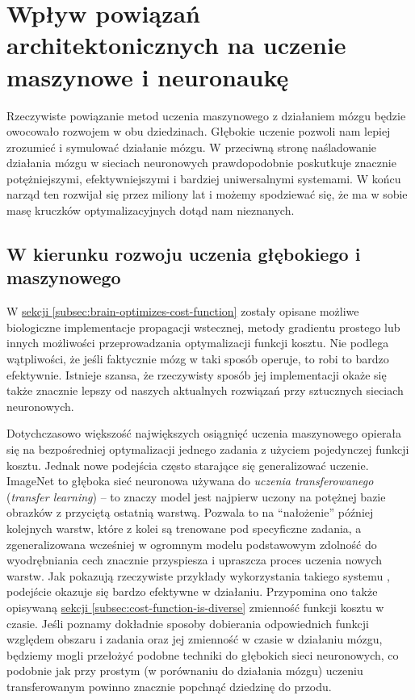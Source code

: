 \section{Wpływ powiązań architektonicznych na uczenie maszynowe i neuronaukę}

Rzeczywiste powiązanie metod uczenia maszynowego z działaniem mózgu będzie owocowało rozwojem w obu dziedzinach.
Głębokie uczenie pozwoli nam lepiej zrozumieć i symulować działanie mózgu.
W przeciwną stronę naśladowanie działania mózgu w sieciach neuronowych prawdopodobnie poskutkuje znacznie potężniejszymi, efektywniejszymi i bardziej uniwersalnymi systemami.
W końcu narząd ten rozwijał się przez miliony lat i możemy spodziewać się, że ma w sobie masę kruczków optymalizacyjnych dotąd nam nieznanych.

\subsection{W kierunku rozwoju uczenia głębokiego i maszynowego}

W \hyperref[subsec:brain-optimizes-cost-function]{sekcji \ref*{subsec:brain-optimizes-cost-function}} zostały opisane możliwe biologiczne implementacje propagacji wstecznej, metody gradientu prostego lub innych możliwości przeprowadzania optymalizacji funkcji kosztu.
Nie podlega wątpliwości, że jeśli faktycznie mózg w taki sposób operuje, to robi to bardzo efektywnie.
Istnieje szansa, że rzeczywisty sposób jej implementacji okaże się także znacznie lepszy od naszych aktualnych rozwiązań przy sztucznych sieciach neuronowych.

Dotychczasowo większość największych osiągnięć uczenia maszynowego opierała się na bezpośredniej optymalizacji jednego zadania z użyciem pojedynczej funkcji kosztu.
Jednak nowe podejścia często starające się generalizować uczenie.
ImageNet to głęboka sieć neuronowa używana do \emph{uczenia transferowanego} (\emph{transfer learning}) -- to znaczy model jest najpierw uczony na potężnej bazie obrazków z przyciętą ostatnią warstwą.
Pozwala to na ``nałożenie'' później kolejnych warstw, które z kolei są trenowane pod specyficzne zadania, a zgeneralizowana wcześniej w ogromnym modelu podstawowym zdolność do wyodrębniania cech znacznie przyspiesza i upraszcza proces uczenia nowych warstw.
Jak pokazują rzeczywiste przykłady wykorzystania takiego systemu \cite{marmanis2015deep}, podejście okazuje się bardzo efektywne w działaniu.
Przypomina ono także opisywaną \hyperref[subsec:cost-function-is-diverse]{sekcji \ref*{subsec:cost-function-is-diverse}} zmienność funkcji kosztu w czasie.
Jeśli poznamy dokładnie sposoby dobierania odpowiednich funkcji względem obszaru i zadania oraz jej zmienność w czasie w działaniu mózgu, będziemy mogli przełożyć podobne techniki do głębokich sieci neuronowych, co podobnie jak przy prostym (w porównaniu do działania mózgu) uczeniu transferowanym powinno znacznie popchnąć dziedzinę do przodu.

